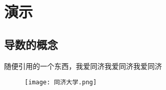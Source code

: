 \documentclass[12pt, a4paper, oneside, UTF8]{ctexbook}
\begin{document}
\else
\fi

\chapter{演示}
\section{导数的概念}
随便引用的一个东西\cite{choy20194d}，我爱同济我爱同济我爱同济
\begin{figure}
    \centering
    \texttt{[image: 同济大学.png]}
\end{figure}


\ifx\allfiles\undefined
\end{document}
